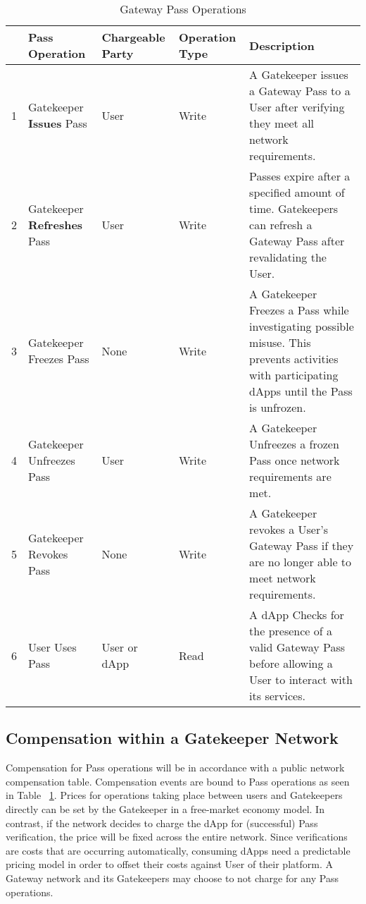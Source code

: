 { %
\renewcommand{\arraystretch}{1.5}
\begin{table}
\centering
\scriptsize
\begin{tabular}{@{}|p{}|p{}|p{}|p{}|p{}|@{}}
\hline
 & \textbf{Pass Operation} & \textbf{Chargeable Party} & \textbf{Operation Type} & \textbf{Description} \\
\hline
1 & Gatekeeper \textbf{Issues} Pass & User & Write & A Gatekeeper issues a Gateway Pass to a User after verifying they meet all network requirements.\\
\hline
2 & Gatekeeper \textbf{Refreshes} Pass & User & Write & Passes expire after a specified amount of time. Gatekeepers can refresh a Gateway Pass after revalidating the User.\\
\hline
3 & Gatekeeper Freezes Pass & None & Write & A Gatekeeper Freezes a Pass while investigating possible misuse. This prevents activities with participating dApps until the Pass is unfrozen.\\
\hline
4 & Gatekeeper Unfreezes Pass & User & Write & A Gatekeeper Unfreezes a frozen Pass once network requirements are met.\\
\hline
5 & Gatekeeper Revokes Pass & None & Write & A Gatekeeper revokes a User’s Gateway Pass if they are no longer able to meet network requirements.\\
\hline
6 & User Uses Pass & User or dApp & Read & A dApp Checks for the presence of a valid Gateway Pass before allowing a User to interact with its services.\\
\hline
\end{tabular}
\caption{Gateway Pass Operations}
\label{tbl:gt-operations}
\end{table}
}

\subsection{Compensation within a Gatekeeper Network}
Compensation for Pass operations will be in accordance with a public network compensation table. Compensation events are bound to Pass operations as seen in Table ~\ref{tbl:gt-operations}.
Prices for operations taking place between users and Gatekeepers directly can be set by the Gatekeeper in a free-market economy model. In contrast, if the network
decides to charge the dApp for (successful) Pass verification, the price will be fixed across the entire network. Since verifications are costs that are occurring automatically, consuming dApps need
a predictable pricing model in order to offset their costs against User of their platform. A Gateway network and its Gatekeepers may choose to not charge for any Pass operations.

